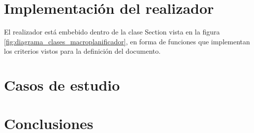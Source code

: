 \section{Implementación del realizador}
El realizador está embebido dentro de la clase Section vista en la figura \ref{fig:diagrama_clases_macroplanificador}, en forma de funciones que implementan los criterios vistos para la definición del documento.


\section{Casos de estudio}


\section{Conclusiones}

